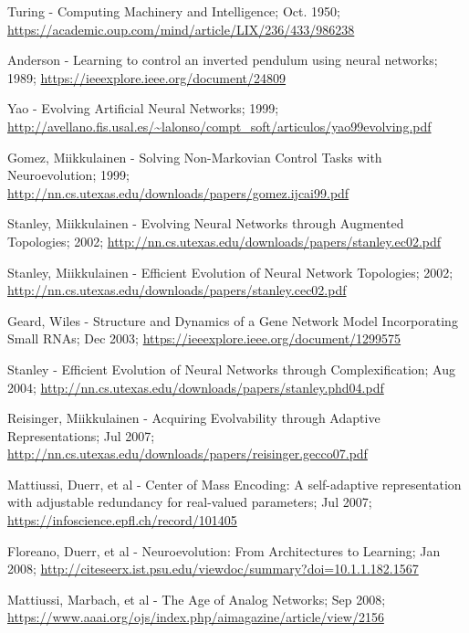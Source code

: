 \documentclass[journal, a4paper]{IEEEtran}
\begin{document}
\begin{thebibliography}{5}

    Turing - Computing Machinery and Intelligence; Oct. 1950;
    \url{https://academic.oup.com/mind/article/LIX/236/433/986238}

    Anderson - Learning to control an inverted pendulum using neural networks; 1989;
    \url{https://ieeexplore.ieee.org/document/24809}

    Yao - Evolving Artificial Neural Networks; 1999;
    \url{http://avellano.fis.usal.es/~lalonso/compt_soft/articulos/yao99evolving.pdf}

    Gomez, Miikkulainen - Solving Non-Markovian Control Tasks with Neuroevolution; 1999;
    \url{http://nn.cs.utexas.edu/downloads/papers/gomez.ijcai99.pdf}

    Stanley, Miikkulainen - Evolving Neural Networks through Augmented Topologies; 2002;
    \url{http://nn.cs.utexas.edu/downloads/papers/stanley.ec02.pdf}

    Stanley, Miikkulainen - Efficient Evolution of Neural Network Topologies; 2002;
    \url{http://nn.cs.utexas.edu/downloads/papers/stanley.cec02.pdf}

    Geard, Wiles - Structure and Dynamics of a Gene Network Model Incorporating Small RNAs; Dec 2003;
    \url{https://ieeexplore.ieee.org/document/1299575}

    Stanley - Efficient Evolution of Neural Networks through Complexification; Aug 2004;
    \url{http://nn.cs.utexas.edu/downloads/papers/stanley.phd04.pdf}

    Reisinger, Miikkulainen - Acquiring Evolvability through Adaptive Representations; Jul 2007;
    \url{http://nn.cs.utexas.edu/downloads/papers/reisinger.gecco07.pdf}

    Mattiussi, Duerr, et al - Center of Mass Encoding: A self-adaptive representation with adjustable redundancy for real-valued parameters; Jul 2007;
    \url{https://infoscience.epfl.ch/record/101405}

    Floreano, Duerr, et al - Neuroevolution: From Architectures to Learning; Jan 2008;
    \url{http://citeseerx.ist.psu.edu/viewdoc/summary?doi=10.1.1.182.1567}

    Mattiussi, Marbach, et al - The Age of Analog Networks; Sep 2008;
    \url{https://www.aaai.org/ojs/index.php/aimagazine/article/view/2156}


\end{thebibliography}
\end{document}
